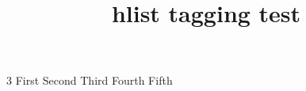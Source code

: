 \documentclass{article}
\title{hlist tagging test}
\begin{document}
\begin{hlist}3
\hitem First
\hitem Second
\hitem Third
\hitem Fourth
\hitem Fifth
\end{hlist}
\end{document}
